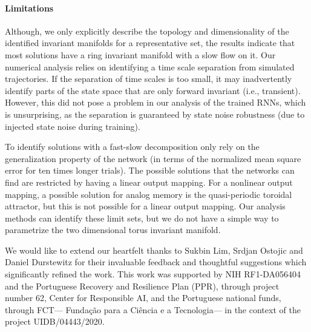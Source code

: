 \documentclass{article} %
\newcounter{ct}
\theoremstyle{definition}
\theoremstyle{remark}
\begin{document}
\paragraph{Limitations}
Although, we only explicitly describe the topology and dimensionality of the identified invariant manifolds for a representative set, the results indicate that most solutions have a ring invariant manifold with a slow flow on it.
Our numerical analysis relies on identifying a time scale separation from simulated trajectories. If the separation of time scales is too small, it may inadvertently identify parts of the state space that are only forward invariant (i.e., transient). However, this did not pose a problem in our analysis of the trained RNNs, which is unsurprising, as the separation is guaranteed by state noise robustness (due to injected state noise during training).

To identify solutions with a fast-slow decomposition only rely on the generalization property of the network (in terms of the normalized mean square error for ten times longer trials).
The possible solutions that the networks can find are restricted by having a linear output mapping.
For a nonlinear output mapping, a possible solution for analog memory is the quasi-periodic toroidal attractor, but this is not possible for a linear output mapping.
Our analysis methods can identify these limit sets, but we do not have a simple way to parametrize the two dimensional torus invariant manifold.







\begin{ack}
We would like to extend our heartfelt thanks to Sukbin Lim, Srdjan Ostojic and Daniel Durstewitz for their invaluable feedback and thoughtful suggestions which significantly refined the work.
This work was supported by NIH RF1-DA056404 and the Portuguese Recovery and Resilience Plan (PPR), through project number 62, Center for Responsible AI, and the Portuguese national funds, through FCT--- Funda\c{c}\~{a}o para a Ci\^{e}ncia e a Tecnologia--- in the context of the project UIDB/04443/2020.
\end{ack}


\end{document}
